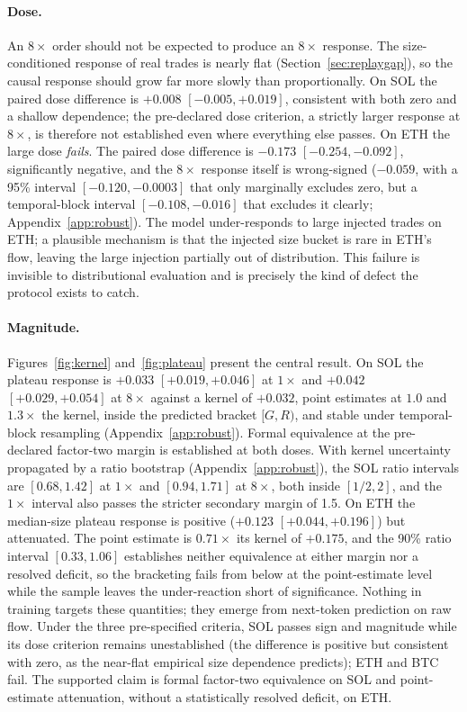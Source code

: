 \documentclass[11pt]{article}
\begin{document}
\paragraph{Dose.} An $8\times$ order should not be expected to produce an $8\times$ response. The size-conditioned response of real trades is nearly flat (Section~\ref{sec:replaygap}), so the causal response should grow far more slowly than proportionally. On SOL the paired dose difference is $+0.008$ $[-0.005, +0.019]$, consistent with both zero and a shallow dependence; the pre-declared dose criterion, a strictly larger response at $8\times$, is therefore not established even where everything else passes. On ETH the large dose \emph{fails}. The paired dose difference is $-0.173$ $[-0.254, -0.092]$, significantly negative, and the $8\times$ response itself is wrong-signed ($-0.059$, with a 95\% interval $[-0.120, -0.0003]$ that only marginally excludes zero, but a temporal-block interval $[-0.108, -0.016]$ that excludes it clearly; Appendix~\ref{app:robust}). The model under-responds to large injected trades on ETH; a plausible mechanism is that the injected size bucket is rare in ETH's flow, leaving the large injection partially out of distribution. This failure is invisible to distributional evaluation and is precisely the kind of defect the protocol exists to catch.

\paragraph{Magnitude.} Figures~\ref{fig:kernel} and~\ref{fig:plateau} present the central result. On SOL the plateau response is $+0.033$ $[+0.019, +0.046]$ at $1\times$ and $+0.042$ $[+0.029, +0.054]$ at $8\times$ against a kernel of $+0.032$, point estimates at $1.0$ and $1.3\times$ the kernel, inside the predicted bracket $[G, R)$, and stable under temporal-block resampling (Appendix~\ref{app:robust}). Formal equivalence at the pre-declared factor-two margin is established at both doses. With kernel uncertainty propagated by a ratio bootstrap (Appendix~\ref{app:robust}), the SOL ratio intervals are $[0.68, 1.42]$ at $1\times$ and $[0.94, 1.71]$ at $8\times$, both inside $[1/2, 2]$, and the $1\times$ interval also passes the stricter secondary margin of 1.5. On ETH the median-size plateau response is positive ($+0.123$ $[+0.044, +0.196]$) but attenuated. The point estimate is $0.71\times$ its kernel of $+0.175$, and the 90\% ratio interval $[0.33, 1.06]$ establishes neither equivalence at either margin nor a resolved deficit, so the bracketing fails from below at the point-estimate level while the sample leaves the under-reaction short of significance. Nothing in training targets these quantities; they emerge from next-token prediction on raw flow. Under the three pre-specified criteria, SOL passes sign and magnitude while its dose criterion remains unestablished (the difference is positive but consistent with zero, as the near-flat empirical size dependence predicts); ETH and BTC fail. The supported claim is formal factor-two equivalence on SOL and point-estimate attenuation, without a statistically resolved deficit, on ETH.
\end{document}
